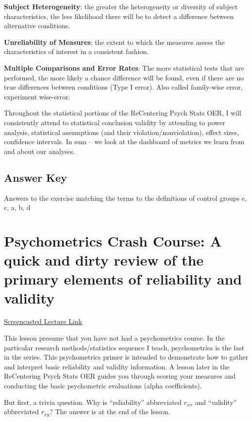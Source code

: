 \documentclass[
  english,
]{book}
\begin{document}
\textbf{Subject Heterogeneity}: the greater the heterogeneity or diversity of subject characteristics, the less likelihood there will be to detect a difference between alternative conditions.

\textbf{Unreliability of Measures}: the extent to which the measures assess the characteristics of interest in a consistent fashion.

\textbf{Multiple Comparisons and Error Rates}: The more statistical tests that are performed, the more likely a chance difference will be found, even if there are no true differences between conditions (Type I error). Also called family-wise error, experiment wise-error.

Throughout the statistical portions of the ReCentering Psych Stats OER, I will consistently attend to statistical conclusion validity by attending to power analysis, statistical assumptions (and their violation/nonviolation), effect sizes, confidence intervals. In sum -- we look at the dashboard of metrics we learn from and about our analyses.

\hypertarget{answer-key}{%
\section{Answer Key}\label{answer-key}}

Answers to the exercise matching the terms to the definitions of control groups
e, c, a, b, d

\hypertarget{Psychometrix}{%
\chapter{Psychometrics Crash Course: A quick and dirty review of the primary elements of reliability and validity}\label{Psychometrix}}

\href{https://spu.hosted.panopto.com/Panopto/Pages/Viewer.aspx?pid=0a485840-5caa-484b-ba16-ac37017d6b05}{Screencasted Lecture Link}

This lesson presume that you have not had a psychometrics course. In the particular research methods/statistics sequence I teach, psychometrics is the last in the series. This psychometrics primer is intended to demonstrate how to gather and interpret basic reliability and validity information. A lesson later in the ReCentering Psych Stats OER guides you through scoring your measures and conducting the basic psychometric evaluations (alpha coefficients).

But first, a trivia question. Why is ``reliability'' abbreviated \(r_{xx}\) and ``validity'' abbreviated \(r_{xy}\)? The answer is at the end of the lesson.
\end{document}
